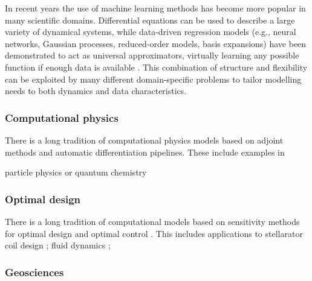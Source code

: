 In recent years the use of machine learning methods has become more popular in many scientific domains. 
Differential equations can be used to describe a large variety of dynamical systems, while data-driven regression models (e.g., neural networks, Gaussian processes, reduced-order models, basis expansions) have been demonstrated to act as universal approximators, virtually learning any possible function if enough data is available \cite{gorban_1998}. 
This combination of structure and flexibility can be exploited by many different domain-specific problems to tailor modelling needs to both dynamics and data characteristics.

\subsubsection{Computational physics}

There is a long tradition of computational physics models based on adjoint methods and automatic differentiation pipelines. 
These include examples in 

particle physics \cite{Dorigo.2022} or quantum chemistry \cite{Arrazola.2021}

\subsubsection{Optimal design}

There is a long tradition of computational models based on sensitivity methods for optimal design and optimal control \cite{lions1971optimal, pironneau2005optimal, allaire2014shape}.
This includes applications to 
stellarator coil design \cite{McGreivy_stellarator_2021}; 
fluid dynamics \cite{Giles_Pierce_2000, mohammadi2009applied};



\subsubsection{Geosciences}

